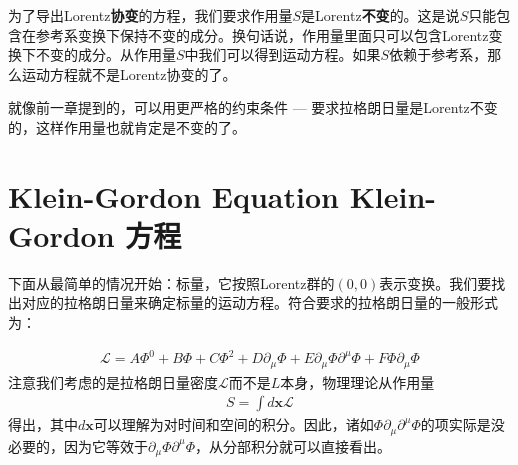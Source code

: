 为了导出Lorentz{\bf 协变}的方程，我们要求作用量$S$是Lorentz{\bf 不变}的。这是说$S$只能包含在参考系变换下保持不变的成分。换句话说，作用量里面只可以包含Lorentz变换下不变的成分。从作用量$S$中我们可以得到运动方程。如果$S$依赖于参考系，那么运动方程就不是Lorentz协变的了。

就像前一章提到的，可以用更严格的约束条件 --- 要求拉格朗日量是Lorentz不变的，这样作用量也就肯定是不变的了。

\section[Klein-Gordon 方程]{Klein-Gordon Equation \quad Klein-Gordon 方程}\label{sec6.2}

下面从最简单的情况开始：标量，它按照Lorentz群的$(0,0)$表示变换。我们要找出对应的拉格朗日量来确定标量的运动方程。符合要求的拉格朗日量的一般形式为：

\begin{align}
\label{equ6.1}
\mathscr{L} = A\Phi^0+B\Phi+C\Phi^2+D\partial_\mu\Phi+E\partial_\mu\Phi\partial^\mu\Phi+F\Phi\partial_\mu\Phi
\end{align}
注意我们考虑的是拉格朗日量密度$\mathscr{L}$而不是$L$本身，物理理论从作用量
\begin{align}
\label{equ6.2}
S = \int d\mathbf{x} \mathscr{L}
\end{align}
得出，其中$d \mathbf{x}$可以理解为对时间和空间的积分。因此，诸如$\Phi\partial_\mu\partial^\mu\Phi$的项实际是没必要的，因为它等效于$\partial_\mu\Phi\partial^\mu\Phi$，从分部积分就可以直接看出。

